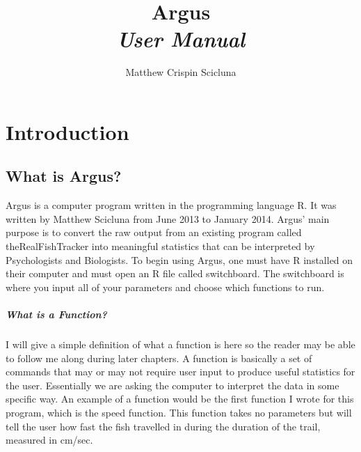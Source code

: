 \documentclass[12pt,titlepage]{report}
\begin{document}
\title{\Huge{Argus} 
\\  \large\emph{User Manual}}
\author{Matthew Crispin Scicluna}
\maketitle
\pagebreak
\tableofcontents
\chapter{Introduction}
\section{What is Argus?}
Argus is a computer program written in the programming language R. It was written by Matthew Scicluna from June 2013 to January 2014. Argus' main purpose is to convert the raw output from an existing program called theRealFishTracker into meaningful statistics that can be interpreted by Psychologists and Biologists. To begin using Argus, one must have R installed on their computer and must open an R file called switchboard. The switchboard is where you input all of your parameters and choose which functions to run.
\paragraph{What is a Function?}
I will give a simple definition of what a function is here so the reader may be able to follow me along during later chapters. A function is basically a set of commands that may or may not require user input to produce useful statistics for the user. Essentially we are asking the computer to interpret the data in some specific way. An example of a function would be the first function I wrote for this program, which is the speed function. This function takes no parameters but will tell the user how fast the fish travelled in during the duration of the trail, measured in cm/sec.
\end{document}
